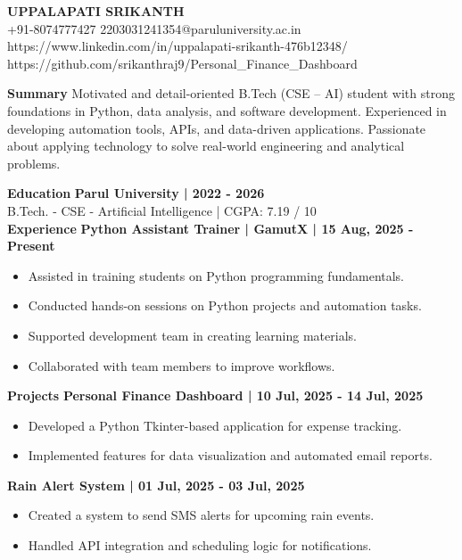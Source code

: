 \documentclass[10pt]{article}
\begin{document}
\begin{center}
    {\LARGE \textbf{UPPALAPATI SRIKANTH}} \\
    +91-8074777427 \textbar{} 2203031241354@paruluniversity.ac.in \textbar{} https://www.linkedin.com/in/uppalapati-srikanth-476b12348/ \textbar{} https://github.com/srikanthraj9/Personal\_Finance\_Dashboard
\end{center}

\textbf{Summary}
Motivated and detail-oriented B.Tech (CSE – AI) student with strong foundations in Python, data analysis, and software development. Experienced in developing automation tools, APIs, and data-driven applications. Passionate about applying technology to solve real-world engineering and analytical problems.

\textbf{Education}
\textbf{Parul University | 2022 - 2026}\\
B.Tech. - CSE - Artificial Intelligence | CGPA: 7.19 / 10\\

\textbf{Experience}
\textbf{Python Assistant Trainer | GamutX | 15 Aug, 2025 - Present}
\begin{itemize}
\item Assisted in training students on Python programming fundamentals.
\item Conducted hands-on sessions on Python projects and automation tasks.
\item Supported development team in creating learning materials.
\item Collaborated with team members to improve workflows.
\end{itemize}

\textbf{Projects}
\textbf{Personal Finance Dashboard | 10 Jul, 2025 - 14 Jul, 2025}
\begin{itemize}
\item Developed a Python Tkinter-based application for expense tracking.
\item Implemented features for data visualization and automated email reports.
\end{itemize}

\textbf{Rain Alert System | 01 Jul, 2025 - 03 Jul, 2025}
\begin{itemize}
\item Created a system to send SMS alerts for upcoming rain events.
\item Handled API integration and scheduling logic for notifications.
\end{itemize}
\end{document}
